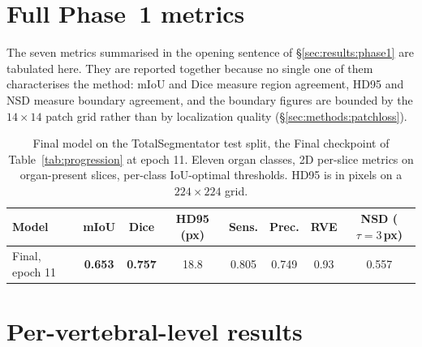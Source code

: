 \documentclass[10pt]{article}
\begin{document}
{\footnotesize
\setlength{\bibsep}{1.5pt plus 0.3ex}

}

\appendix

\section{Full Phase~1 metrics}
\label{app:overall}

The seven metrics summarised in the opening sentence of
\S\ref{sec:results:phase1} are tabulated here. They are reported together
because no single one of them characterises the method: mIoU and Dice measure
region agreement, HD95 and NSD measure boundary agreement, and the boundary
figures are bounded by the $14\times14$ patch grid rather than by localization
quality (\S\ref{sec:methods:patchloss}).

\begin{table}[H]
\centering
\caption{Final model on the TotalSegmentator test split, the Final checkpoint of
Table~\ref{tab:progression} at epoch 11. Eleven organ classes, 2D per-slice
metrics on organ-present slices, per-class IoU-optimal thresholds. HD95 is in
pixels on a $224\times224$ grid.}
\label{tab:overall}
\begin{tabular}{lccccccc}
\toprule
Model & mIoU & Dice & HD95 (px) & Sens. & Prec. & RVE & NSD ($\tau=3$\,px) \\
\midrule
Final, epoch 11 & \textbf{0.653} & \textbf{0.757} & 18.8 & 0.805 & 0.749 & 0.93 & 0.557 \\
\bottomrule
\end{tabular}
\end{table}

\section{Per-vertebral-level results}
\label{app:perlevel}
\end{document}
